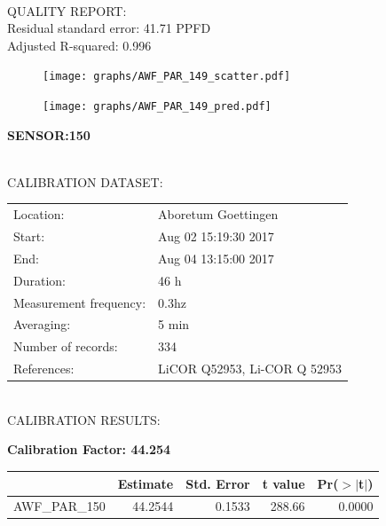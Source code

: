 \documentclass[oneside]{report}
\begin{document}
\hrulefill\\
QUALITY REPORT:\\
Residual standard error: 41.71 PPFD\\
Adjusted R-squared: 0.996



\begin{figure}[H]
  \centering
  \texttt{[image: graphs/AWF\_PAR\_149\_scatter.pdf]}
\end{figure}




\begin{figure}[H]
  \centering
  \texttt{[image: graphs/AWF\_PAR\_149\_pred.pdf]}
\end{figure}

\pagebreak


\begin{center}
\large{\textbf{SENSOR:150}}\\
\end{center}

\hrulefill\\
CALIBRATION DATASET:\\
\begin{table}[h!]
  \centering
  \label{tab:table1}
  \begin{tabular}{ll}
    Location: & Aboretum Goettingen\\ 
    
    
    Start:  & Aug 02 15:19:30 2017 \\
    End:   & Aug 04 13:15:00 2017\\ 
    Duration: & 46 h\\
    Measurement frequency: & 0.3hz\\
    Averaging:  &5 min\\
    Number of records: & 334 \\
    References: & LiCOR Q52953, Li-COR Q 52953 \\
  \end{tabular}
\end{table}

\hrulefill\\
CALIBRATION RESULTS:\\


\begin{center}
\textbf{\large{Calibration Factor: 44.254}}\\
\end{center}
\begin{table}[ht]
\centering
\begin{tabular}{rrrrr}
  \hline
 & Estimate & Std. Error & t value & Pr($>$$|$t$|$) \\ 
  \hline
AWF\_PAR\_150 & 44.2544 & 0.1533 & 288.66 & 0.0000 \\ 
   \hline
\end{tabular}
\end{table}
\end{document}
